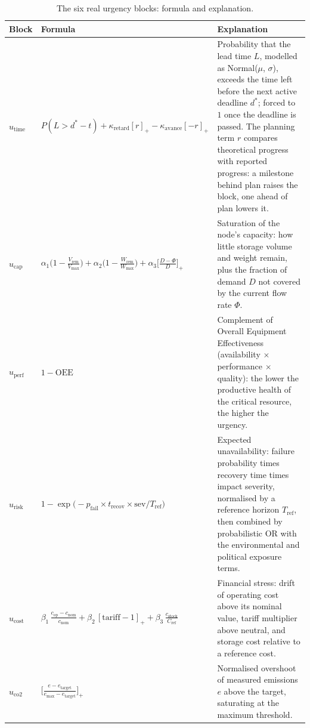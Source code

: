 \begin{table}[H]
\centering
\caption{The six real urgency blocks: formula and explanation.}
\label{tab:ur_blocks}
\small
\begin{tabularx}{\linewidth}{l >{\raggedright\arraybackslash}p{4.6cm} X}
\toprule
\textbf{Block} & \textbf{Formula} & \textbf{Explanation} \\
\midrule
$u_{\text{time}}$ & $P(L > d^\ast - t) + \kappa_{\text{retard}}[r]_+ - \kappa_{\text{avance}}[-r]_+$ & Probability that the lead time $L$, modelled as Normal($\mu$, $\sigma$), exceeds the time left before the next active deadline $d^\ast$; forced to $1$ once the deadline is passed. The planning term $r$ compares theoretical progress with reported progress: a milestone behind plan raises the block, one ahead of plan lowers it. \\
\midrule
$u_{\text{cap}}$ & $\alpha_1\bigl(1-\tfrac{V_{\text{rem}}}{V_{\max}}\bigr) + \alpha_2\bigl(1-\tfrac{W_{\text{rem}}}{W_{\max}}\bigr) + \alpha_3\bigl[\tfrac{D-\Phi}{D}\bigr]_+$ & Saturation of the node's capacity: how little storage volume and weight remain, plus the fraction of demand $D$ not covered by the current flow rate $\Phi$. \\
\midrule
$u_{\text{perf}}$ & $1 - \text{OEE}$ & Complement of Overall Equipment Effectiveness (availability $\times$ performance $\times$ quality): the lower the productive health of the critical resource, the higher the urgency. \\
\midrule
$u_{\text{risk}}$ & $1-\exp\bigl(-p_{\text{fail}} \times t_{\text{recov}} \times \text{sev}/T_{\text{ref}}\bigr)$ & Expected unavailability: failure probability times recovery time times impact severity, normalised by a reference horizon $T_{\text{ref}}$, then combined by probabilistic OR with the environmental and political exposure terms. \\
\midrule
$u_{\text{cost}}$ & $\beta_1\,\tfrac{c_{\text{op}}-c_{\text{nom}}}{c_{\text{nom}}} + \beta_2\,[\text{tariff}-1]_+ + \beta_3\,\tfrac{c_{\text{stock}}}{C_{\text{ref}}}$ & Financial stress: drift of operating cost above its nominal value, tariff multiplier above neutral, and storage cost relative to a reference cost. \\
\midrule
$u_{\text{co2}}$ & $\bigl[\tfrac{e - e_{\text{target}}}{e_{\max}-e_{\text{target}}}\bigr]_+$ & Normalised overshoot of measured emissions $e$ above the target, saturating at the maximum threshold. \\
\bottomrule
\end{tabularx}
\end{table}

